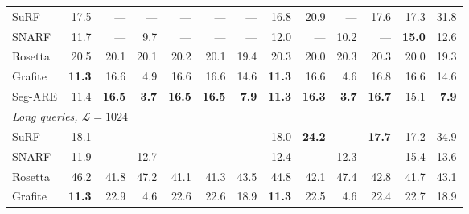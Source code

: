 \begin{table}[H]
\begin{tabular}{@{}lrrrrrr|rrrrrr@{}}
        \midrule
        SuRF    & 17.5          & \textnormal{---} & \textnormal{---} & \textnormal{---} & \textnormal{---} & \textnormal{---} & 16.8          & 20.9             & \textnormal{---} & 17.6             & 17.3          & 31.8         \\
        SNARF   & 11.7          & \textnormal{---} & 9.7              & \textnormal{---} & \textnormal{---} & \textnormal{---} & 12.0          & \textnormal{---} & 10.2             & \textnormal{---} & \textbf{15.0} & 12.6         \\
        Rosetta & 20.5          & 20.1             & 20.1             & 20.2             & 20.1             & 19.4             & 20.3          & 20.0             & 20.3             & 20.3             & 20.0          & 19.3         \\
        Grafite & \textbf{11.3} & 16.6             & 4.9              & 16.6             & 16.6             & 14.6             & \textbf{11.3} & 16.6             & 4.6              & 16.8             & 16.6          & 14.6         \\
        Seg-ARE & 11.4          & \textbf{16.5}    & \textbf{3.7}     & \textbf{16.5}    & \textbf{16.5}    & \textbf{7.9}     & \textbf{11.3} & \textbf{16.3}    & \textbf{3.7}     & \textbf{16.7}    & 15.1          & \textbf{7.9} \\
        \midrule
        \multicolumn{13}{l}{\textit{Long queries, $\mathcal{L} = 1024$}} \\
        \midrule
        SuRF    & 18.1          & \textnormal{---} & \textnormal{---} & \textnormal{---} & \textnormal{---} & \textnormal{---} & 18.0          & \textbf{24.2}    & \textnormal{---} & \textbf{17.7}    & 17.2          & 34.9         \\
        SNARF   & 11.9          & \textnormal{---} & 12.7             & \textnormal{---} & \textnormal{---} & \textnormal{---} & 12.4          & \textnormal{---} & 12.3             & \textnormal{---} & 15.4          & 13.6         \\
        Rosetta & 46.2          & 41.8             & 47.2             & 41.1             & 41.3             & 43.5             & 44.8          & 42.1             & 47.4             & 42.8             & 41.7          & 43.1         \\
        Grafite & \textbf{11.3} & 22.9             & 4.6              & 22.6             & 22.6             & 18.9             & \textbf{11.3} & 22.5             & 4.6              & 22.4             & 22.7          & 18.9         \\

\end{tabular}
\end{table}
